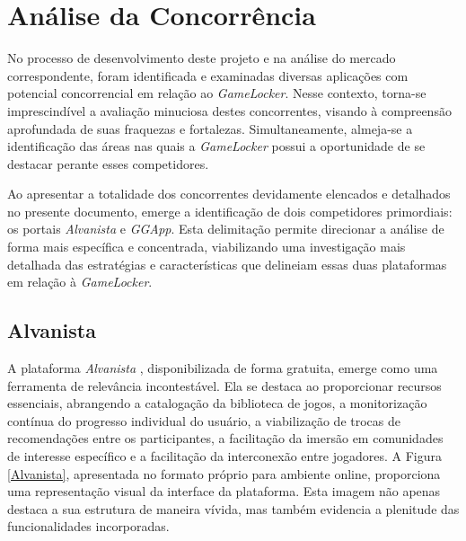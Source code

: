    \section{Análise da Concorrência}

No processo de desenvolvimento deste projeto e na análise do mercado correspondente, foram identificada e examinadas     diversas aplicações com potencial concorrencial em relação ao \textit{GameLocker}. Nesse contexto, torna-se imprescindível a avaliação minuciosa destes concorrentes, visando à compreensão aprofundada de suas fraquezas e fortalezas. Simultaneamente, almeja-se a identificação das áreas nas quais a \textit{GameLocker} possui a oportunidade de se destacar perante esses competidores.

Ao apresentar a totalidade dos concorrentes devidamente elencados e detalhados no presente documento, emerge a identificação de dois competidores primordiais: os portais \textit{\gls{Alvanista}} e \textit{\gls{GGApp}}. Esta delimitação permite direcionar a análise de forma mais específica e concentrada, viabilizando uma investigação mais detalhada das estratégias e características que delineiam essas duas plataformas em relação à \textit{GameLocker}.

\subsection{Alvanista}

A plataforma \textit{\gls{Alvanista}} \cite{alvanista}, disponibilizada de forma gratuita, emerge como uma ferramenta de relevância incontestável. Ela se destaca ao proporcionar recursos essenciais, abrangendo a catalogação da biblioteca de jogos, a monitorização contínua do progresso individual do usuário, a viabilização de trocas de recomendações entre os participantes, a facilitação da imersão em comunidades de interesse específico e a facilitação da interconexão entre jogadores. A Figura \ref{Alvanista}, apresentada no formato próprio para ambiente online, proporciona uma representação visual da interface da plataforma. Esta imagem não apenas destaca a sua estrutura de maneira vívida, mas também evidencia a plenitude das funcionalidades incorporadas.

